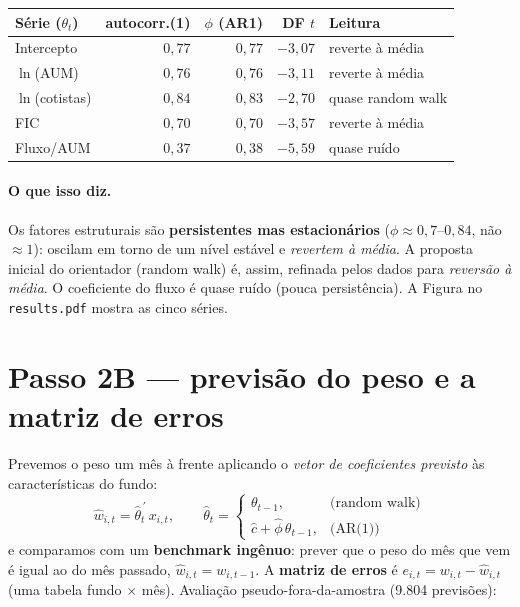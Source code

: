 \documentclass[11pt]{article}
\begin{document}
\begin{table}[h]\centering
\begin{tabular}{@{}lrrrl@{}}
\toprule
Série ($\theta_t$) & autocorr.(1) & $\phi$ (AR1) & DF $t$ & Leitura \\
\midrule
Intercepto      & $0{,}77$ & $0{,}77$ & $-3{,}07$ & reverte à média \\
$\ln$(AUM)      & $0{,}76$ & $0{,}76$ & $-3{,}11$ & reverte à média \\
$\ln$(cotistas) & $0{,}84$ & $0{,}83$ & $-2{,}70$ & quase random walk \\
FIC             & $0{,}70$ & $0{,}70$ & $-3{,}57$ & reverte à média \\
Fluxo/AUM       & $0{,}37$ & $0{,}38$ & $-5{,}59$ & quase ruído \\
\bottomrule
\end{tabular}
\end{table}

\paragraph{O que isso diz.} Os fatores estruturais são \textbf{persistentes mas
estacionários} ($\phi\approx0{,}7$--$0{,}84$, não $\approx1$): oscilam em torno de um
nível estável e \emph{revertem à média}. A proposta inicial do orientador (random
walk) é, assim, refinada pelos dados para \emph{reversão à média}. O coeficiente do
fluxo é quase ruído (pouca persistência). A Figura no \texttt{results.pdf} mostra as
cinco séries.

\section{Passo 2B --- previsão do peso e a matriz de erros}

Prevemos o peso um mês à frente aplicando o \emph{vetor de coeficientes previsto} às
características do fundo:
\begin{equation}
\widehat{w}_{i,t}=\widehat{\theta}_t^{\,\prime}\,x_{i,t},\qquad
\widehat{\theta}_t=
\begin{cases}
\theta_{t-1}, & \text{(random walk)}\\
\widehat{c}+\widehat{\phi}\,\theta_{t-1}, & \text{(AR(1))}
\end{cases}
\label{eq:fc}
\end{equation}
e comparamos com um \textbf{benchmark ingênuo}: prever que o peso do mês que vem é
igual ao do mês passado, $\widehat{w}_{i,t}=w_{i,t-1}$. A \textbf{matriz de erros} é
$e_{i,t}=w_{i,t}-\widehat{w}_{i,t}$ (uma tabela fundo $\times$ mês). Avaliação
pseudo-fora-da-amostra (9.804 previsões):
\end{document}

